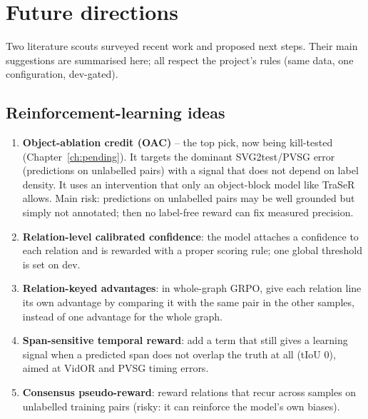 \documentclass[11pt,openany]{book}
\begin{document}
\chapter{Future directions}\label{ch:future}

Two literature scouts surveyed recent work and proposed next steps. Their main suggestions are summarised here; all respect the
project's rules (same data, one configuration, dev-gated).

\section{Reinforcement-learning ideas}
\begin{enumerate}
  \item \textbf{Object-ablation credit (OAC)} -- the top pick, now being kill-tested (Chapter~\ref{ch:pending}). It targets the
  dominant SVG2test/PVSG error (predictions on unlabelled pairs) with a signal that does not depend on label density. It uses an
  intervention that only an object-block model like TraSeR allows. Main risk: predictions on unlabelled pairs may be well grounded
  but simply not annotated; then no label-free reward can fix measured precision.
  \item \textbf{Relation-level calibrated confidence}: the model attaches a confidence to each relation and is rewarded with a proper
  scoring rule; one global threshold is set on dev.
  \item \textbf{Relation-keyed advantages}: in whole-graph GRPO, give each relation line its own advantage by comparing it with the
  same pair in the other samples, instead of one advantage for the whole graph.
  \item \textbf{Span-sensitive temporal reward}: add a term that still gives a learning signal when a predicted span does not overlap
  the truth at all (tIoU 0), aimed at VidOR and PVSG timing errors.
  \item \textbf{Consensus pseudo-reward}: reward relations that recur across samples on unlabelled training pairs (risky: it can
  reinforce the model's own biases).
\end{enumerate}
\end{document}
